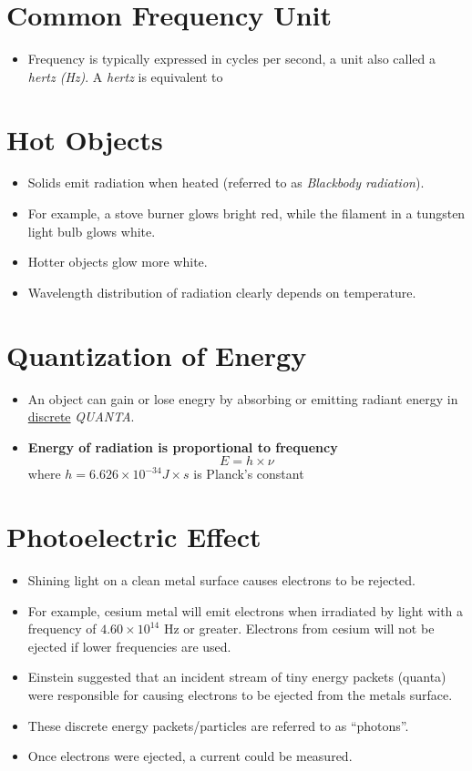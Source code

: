 \documentclass[
	chapter=7,
	title={Quantum Theory {\&} the Electronic Structure of Atoms},
	showanswers=true,
]{chem122notes}
\begin{document}
\section{Common Frequency Unit}\label{sec:common-frequency-unit}
\begin{itemize}
	\item Frequency is typically expressed in cycles per second, a unit also called a \emph{hertz (Hz)}. A \emph{hertz} is equivalent to
\end{itemize}

\section{Hot Objects}\label{sec:hot-objects}
\begin{itemize}
	\item Solids emit radiation when heated (referred to as \textit{Blackbody radiation}).
	\item For example, a stove burner glows bright red, while the filament in a tungsten light bulb glows white.
	\item Hotter objects glow more white.
	\item Wavelength distribution of radiation clearly depends on temperature.
\end{itemize}

\section{Quantization of Energy}\label{sec:quantization-of-energy}
\begin{itemize}
	\item An object can gain or lose enegry by absorbing or emitting radiant energy in \underline{discrete} \emph{QUANTA}.
	\item \textbf{Energy of radiation is proportional to frequency}
	\begin{equation}
		E = h \times \nu
		\label{eq:planck-radiation}
	\end{equation}
	where $h=6.626 \times 10^{-34} J\times s$ is Planck's constant
\end{itemize}

\section{Photoelectric Effect}\label{sec:photoelectric-effect}
\begin{itemize}
	\item Shining light on a clean metal surface causes electrons to be rejected.
	\item For example, cesium metal will emit electrons when irradiated by light with a frequency of $4.60 \times 10^{14}$ Hz or greater.
	Electrons from cesium will not be ejected if lower frequencies are used.
	\item Einstein suggested that an incident stream of tiny energy packets (quanta) were responsible for causing electrons to be ejected from the metals surface.
	\item These discrete energy packets/particles are referred to as ``photons''.
	\item Once electrons were ejected, a current could be measured.
\end{itemize}
\end{document}
